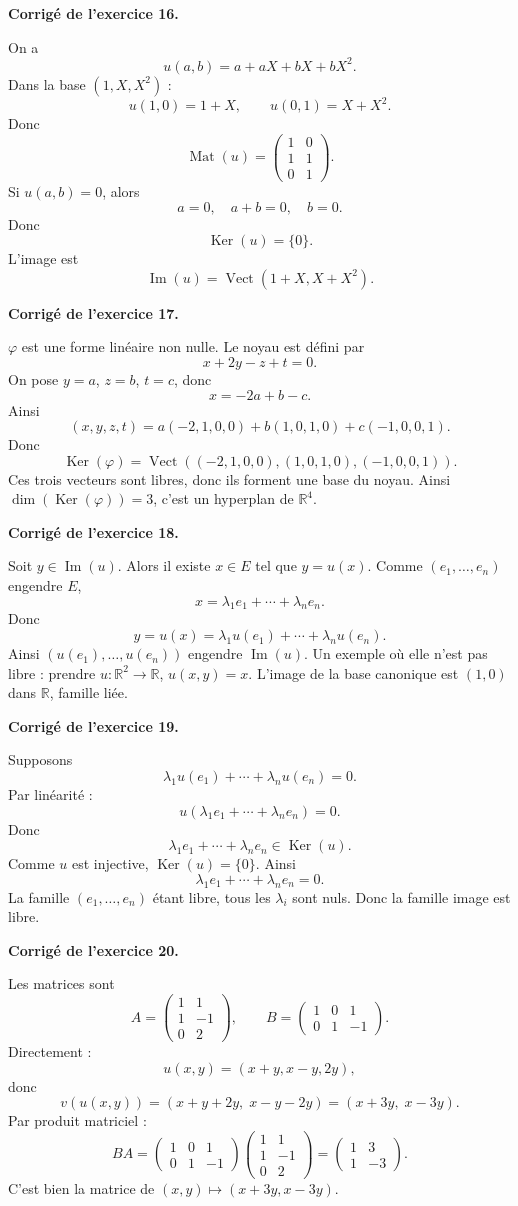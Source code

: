 \documentclass[11pt,a4paper]{article}
\newcommand{\corr}[1]{
    \vspace{0.35cm}
    \noindent\textbf{\textcolor{blue!60!black}{Corrigé de l'exercice #1.}}
    \par
}
\newcommand{\Ker}{\operatorname{Ker}}
\newcommand{\Img}{\operatorname{Im}}
\newcommand{\Mat}{\operatorname{Mat}}
\newcommand{\Vect}{\operatorname{Vect}}
\begin{document}
\corr{16}
On a
\[
u(a,b)=a+aX+bX+bX^2.
\]
Dans la base $(1,X,X^2)$ :
\[
u(1,0)=1+X,\qquad u(0,1)=X+X^2.
\]
Donc
\[
\Mat(u)=
\begin{pmatrix}
1&0\\
1&1\\
0&1
\end{pmatrix}.
\]
Si $u(a,b)=0$, alors
\[
a=0,\quad a+b=0,\quad b=0.
\]
Donc
\[
\Ker(u)=\{0\}.
\]
L'image est
\[
\Img(u)=\Vect(1+X,X+X^2).
\]

\corr{17}
$\varphi$ est une forme linéaire non nulle. Le noyau est défini par
\[
x+2y-z+t=0.
\]
On pose $y=a$, $z=b$, $t=c$, donc
\[
x=-2a+b-c.
\]
Ainsi
\[
(x,y,z,t)=a(-2,1,0,0)+b(1,0,1,0)+c(-1,0,0,1).
\]
Donc
\[
\Ker(\varphi)=\Vect((-2,1,0,0),(1,0,1,0),(-1,0,0,1)).
\]
Ces trois vecteurs sont libres, donc ils forment une base du noyau. Ainsi $\dim(\Ker(\varphi))=3$, c'est un hyperplan de $\mathbb{R}^4$.

\corr{18}
Soit $y\in\Img(u)$. Alors il existe $x\in E$ tel que $y=u(x)$. Comme $(e_1,\dots,e_n)$ engendre $E$,
\[
x=\lambda_1e_1+\cdots+\lambda_ne_n.
\]
Donc
\[
y=u(x)=\lambda_1u(e_1)+\cdots+\lambda_nu(e_n).
\]
Ainsi $(u(e_1),\dots,u(e_n))$ engendre $\Img(u)$.
Un exemple où elle n'est pas libre : prendre $u:\mathbb{R}^2\to\mathbb{R}$, $u(x,y)=x$. L'image de la base canonique est $(1,0)$ dans $\mathbb{R}$, famille liée.

\corr{19}
Supposons
\[
\lambda_1u(e_1)+\cdots+\lambda_nu(e_n)=0.
\]
Par linéarité :
\[
u(\lambda_1e_1+\cdots+\lambda_ne_n)=0.
\]
Donc
\[
\lambda_1e_1+\cdots+\lambda_ne_n\in\Ker(u).
\]
Comme $u$ est injective, $\Ker(u)=\{0\}$. Ainsi
\[
\lambda_1e_1+\cdots+\lambda_ne_n=0.
\]
La famille $(e_1,\dots,e_n)$ étant libre, tous les $\lambda_i$ sont nuls. Donc la famille image est libre.

\corr{20}
Les matrices sont
\[
A=
\begin{pmatrix}
1&1\\
1&-1\\
0&2
\end{pmatrix},
\qquad
B=
\begin{pmatrix}
1&0&1\\
0&1&-1
\end{pmatrix}.
\]
Directement :
\[
u(x,y)=(x+y,x-y,2y),
\]
donc
\[
v(u(x,y))=(x+y+2y,\;x-y-2y)=(x+3y,\;x-3y).
\]
Par produit matriciel :
\[
BA=
\begin{pmatrix}
1&0&1\\
0&1&-1
\end{pmatrix}
\begin{pmatrix}
1&1\\
1&-1\\
0&2
\end{pmatrix}
=
\begin{pmatrix}
1&3\\
1&-3
\end{pmatrix}.
\]
C'est bien la matrice de $(x,y)\mapsto(x+3y,x-3y)$.
\end{document}

